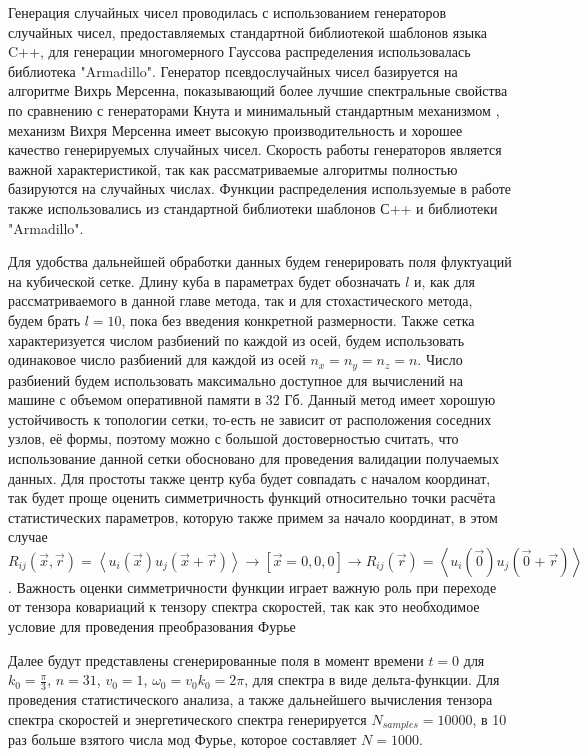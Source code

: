 Генерация случайных чисел проводилась с использованием генераторов случайных чисел, предоставляемых стандартной библиотекой шаблонов языка C++, для генерации многомерного Гауссова распределения использовалась библиотека "Armadillo". Генератор псевдослучайных чисел базируется на алгоритме Вихрь Мерсенна, показывающий более лучшие спектральные свойства по сравнению с генераторами Кнута и минимальный стандартным механизмом \cite{l2002object}, механизм Вихря Мерсенна имеет высокую производительность и хорошее качество генерируемых случайных чисел. Скорость работы генераторов является важной характеристикой, так как рассматриваемые алгоритмы полностью базируются на случайных числах. Функции распределения используемые в работе также использовались из стандартной библиотеки шаблонов С++ и библиотеки "Armadillo". 

Для удобства дальнейшей обработки данных будем генерировать поля флуктуаций на кубической сетке. Длину куба в параметрах будет обозначать $l$ и, как для рассматриваемого в данной главе метода, так и для стохастического метода, будем брать $l = 10$, пока без введения конкретной размерности. Также сетка характеризуется числом разбиений по каждой из осей, будем использовать одинаковое число разбиений для каждой из осей $n_x = n_y = n_z = n$. Число разбиений будем использовать максимально доступное для вычислений на машине с объемом оперативной памяти в 32 Гб. Данный метод имеет хорошую устойчивость к топологии сетки, то-есть не зависит от расположения соседних узлов, её формы, поэтому можно с большой достоверностью считать, что использование данной сетки обосновано для проведения валидации получаемых данных. Для простоты также центр куба будет совпадать с началом координат, так будет проще оценить симметричность функций относительно точки расчёта статистических параметров, которую также примем за начало координат, в этом случае $R_{ij}(\vec x, \vec r) = \left< u_i(\vec x) u_j(\vec x + \vec r) \right> \rightarrow \left[ \vec x = {0, 0, 0} \right] \rightarrow R_{ij}(\vec r) = \left< u_i(\vec 0) u_j(\vec 0 + \vec r) \right>$. Важность оценки симметричности функции играет важную роль при переходе от тензора ковариаций к тензору спектра скоростей, так как это необходимое условие для проведения преобразования Фурье

Далее будут представлены сгенерированные поля в момент времени $t = 0$ для $k_0 = \frac{\pi}{3}$, $n = 31$, $v_0 = 1$, $\omega_0 = v_0 k_0 = 2 \pi$, для спектра в виде дельта-функции. Для проведения статистического анализа, а также дальнейшего вычисления тензора спектра скоростей и энергетического спектра генерируется $N_{samples} = 10000$, в 10 раз больше взятого числа мод Фурье, которое составляет $N = 1000$. 

